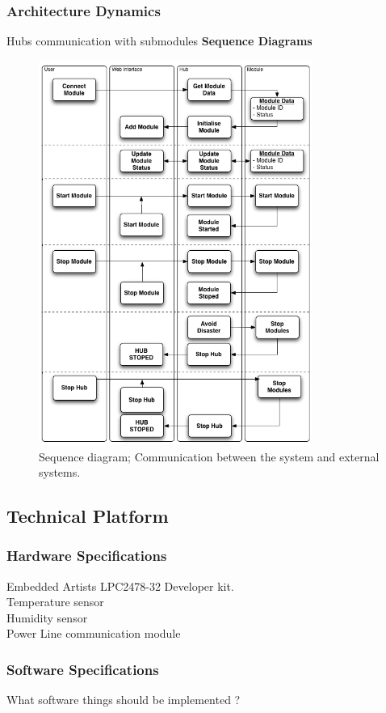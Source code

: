 	\subsubsection{Architecture Dynamics}
		Hubs communication with submodules
		\textbf{Sequence Diagrams}
		\begin{figure}[h!]		%
			\begin{centering}
				 \includegraphics[width=0.8\textwidth]{images/SequenceDiagram.png}
				\caption{Sequence diagram; Communication between the system and external systems.}
		 	\end{centering}
		\end{figure}	
\subsection{Technical Platform}

	\subsubsection{Hardware Specifications}
	Embedded Artists LPC2478-32 Developer kit.
	\\Temperature sensor
	\\Humidity sensor
	\\Power Line communication module
	\subsubsection{Software Specifications}
	What software things should be implemented ?
	\\

